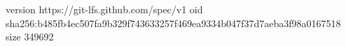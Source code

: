 version https://git-lfs.github.com/spec/v1
oid sha256:b485fb4ec507fa9b329f743633257f469ea9334b047f37d7aeba3f98a0167518
size 349692
